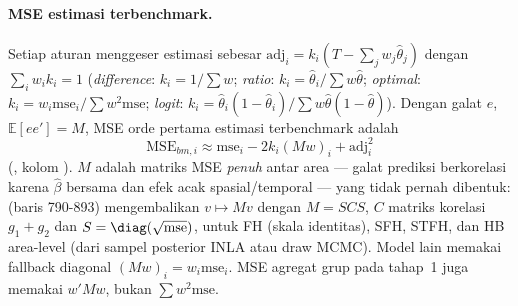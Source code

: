 \paragraph{MSE estimasi terbenchmark.} Setiap aturan menggeser estimasi sebesar
$\mathrm{adj}_i=k_i(T-\sum_jw_j\hat\theta_j)$ dengan $\sum_iw_ik_i=1$
(\emph{difference}: $k_i=1/\sum w$; \emph{ratio}: $k_i=\hat\theta_i/\sum
w\hat\theta$; \emph{optimal}: $k_i=w_i\mathrm{mse}_i/\sum w^2\mathrm{mse}$;
\emph{logit}: $k_i=\hat\theta_i(1-\hat\theta_i)/\sum w\hat\theta(1-\hat\theta)$).
Dengan galat $e$, $\mathbb E[ee']=M$, MSE orde pertama estimasi terbenchmark
adalah
\begin{equation}
  \mathrm{MSE}_{bm,i}\approx\mathrm{mse}_i-2k_i(Mw)_i+\mathrm{adj}_i^2
  \label{eq:bm-mse}
\end{equation}
(, kolom ). $M$ adalah
matriks MSE \emph{penuh} antar area --- galat prediksi berkorelasi karena
$\hat\beta$ bersama dan efek acak spasial/temporal --- yang tidak pernah
dibentuk:  (baris 790-893) mengembalikan $v\mapsto Mv$
dengan $M=SCS$, $C$ matriks korelasi $g_1+g_2$ dan $S=\diag(\sqrt{\mathrm{mse}})$,
untuk FH (skala identitas), SFH, STFH, dan HB area-level (dari sampel
posterior INLA atau draw MCMC). Model lain memakai fallback diagonal
$(Mw)_i=w_i\mathrm{mse}_i$. MSE agregat grup pada tahap~1 juga memakai
$w'Mw$, bukan $\sum w^2\mathrm{mse}$.

